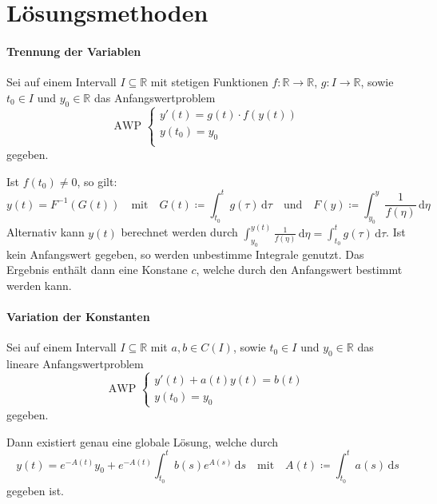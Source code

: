 \section{Lösungsmethoden}
	\paragraph{Trennung der Variablen}
		Sei auf einem Intervall $ I \subseteq \mathbb{R} $ mit stetigen Funktionen $ f : \mathbb{R} \rightarrow \mathbb{R} $, $ g : I \rightarrow \mathbb{R} $, sowie $ t _ 0 \in I $ und $ y _ 0 \in \mathbb{R} $ das Anfangswertproblem
		\begin{equation*}
			\text{AWP }
			\begin{cases}
				y'(t) = g(t) \cdot f(y(t)) \\
				y(t _ 0) = y _ 0           \\
			\end{cases}
		\end{equation*}
		gegeben.

		Ist $ f(t _ 0) \neq 0 $, so gilt:
		\begin{equation*}
			y(t) = F ^ { -1 } (G(t)) \quad\text{mit}\quad G(t) \coloneqq \int _ { t _ 0 } ^ t \! g(\tau) \, \mathrm{d}\tau \quad\text{und}\quad F(y) \coloneqq \int _ { y _ 0 } ^ y \! \frac{1}{f(\eta)} \, \mathrm{d}\eta
		\end{equation*}
		Alternativ kann $ y(t) $ berechnet werden durch $ \int _ { y _ 0 } ^ { y(t) } \! \frac{1}{f(\eta)} \, \mathrm{d}\eta = \int _ { t _ 0 } ^ { t } \! g(\tau) \, \mathrm{d}\tau $. Ist kein Anfangswert gegeben, so werden unbestimme Integrale genutzt. Das Ergebnis enthält dann eine Konstane $ c $, welche durch den Anfangswert bestimmt werden kann.

	\paragraph{Variation der Konstanten}
		Sei auf einem Intervall $ I \subseteq \mathbb{R} $ mit $ a, b \in C(I) $, sowie $ t _ 0 \in I $ und $ y _ 0 \in \mathbb{R} $ das lineare Anfangswertproblem
		\begin{equation*}
			\text{AWP }
			\begin{cases}
				y'(t) + a(t)y(t) = b(t) \\
				y(t _ 0) = y _ 0
			\end{cases}
		\end{equation*}
		gegeben.

		Dann existiert genau eine globale Lösung, welche durch
		\begin{equation*}
			y(t) = e ^ { -A(t) } y _ 0 + e ^ { -A(t) } \int _ { t _ 0 } ^ t \! b(s) e ^ { A(s) } \, \mathrm{d}s \quad\text{mit}\quad A(t) \coloneqq \int _ { t _ 0 } ^ t \! a(s) \, \mathrm{d}s
		\end{equation*}
		gegeben ist.

